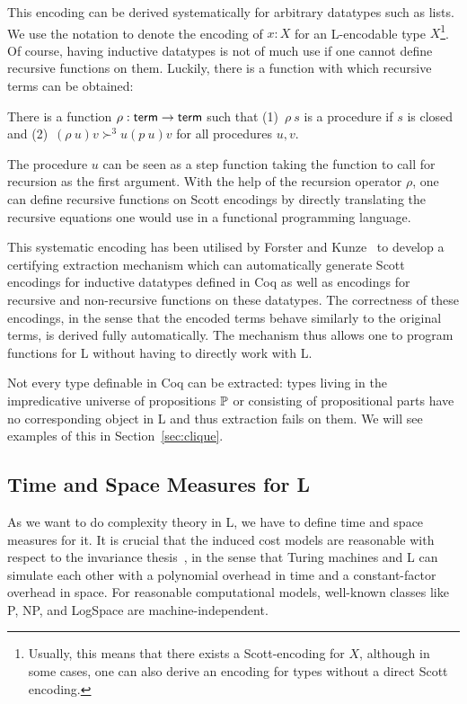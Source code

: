 This encoding can be derived systematically for arbitrary datatypes such as lists. We use the notation  to denote the encoding of $x : X$ for an L-encodable type $X$\footnote{Usually, this means that there exists a Scott-encoding for $X$, although in some cases, one can also derive an encoding for types without a direct Scott encoding.}.
Of course, having inductive datatypes is not of much use if one cannot define recursive functions on them. 
Luckily, there is a function with which recursive terms can be obtained: 
\begin{fact}
  There is a function $\rho : \textsf{term} \rightarrow \textsf{term}$ such that (1)~$\rho~s$ is a procedure if $s$ is closed and (2)~$(\rho~u)v \succ^3 u(p~u)v$ for all procedures $u, v$.
\end{fact}
The procedure $u$ can be seen as a step function taking the function to call for recursion as the first argument. 
With the help of the recursion operator $\rho$, one can define recursive functions on Scott encodings by directly translating the recursive equations one would use in a functional programming language.

This systematic encoding has been utilised by Forster and Kunze~\cite{ForsterKunze:2019:Certifying-extraction} to develop a certifying extraction mechanism which can automatically generate Scott encodings for inductive datatypes defined in Coq as well as encodings for recursive and non-recursive functions on these datatypes. The correctness of these encodings, in the sense that the encoded terms behave similarly to the original terms, is derived fully automatically.
The mechanism thus allows one to program functions for L without having to directly work with L.

\begin{remark}
  Not every type definable in Coq can be extracted: types living in the impredicative universe of propositions $\mathbb{P}$ or consisting of propositional parts have no corresponding object in L and thus extraction fails on them. 
  We will see examples of this in Section~\ref{sec:clique}. 
\end{remark}

\subsection{Time and Space Measures for L}\label{sec:time_and_space}
As we want to do complexity theory in L, we have to define time and space measures for it.
It is crucial that the induced cost models are reasonable with respect to the invariance thesis~\cite{slot_boas:invariance}, in the sense that Turing machines and L can simulate each other with a polynomial overhead in time and a constant-factor overhead in space. For reasonable computational models, well-known classes like \textsf{P}, \textsf{NP}, and \textsf{LogSpace} are machine-independent. 


